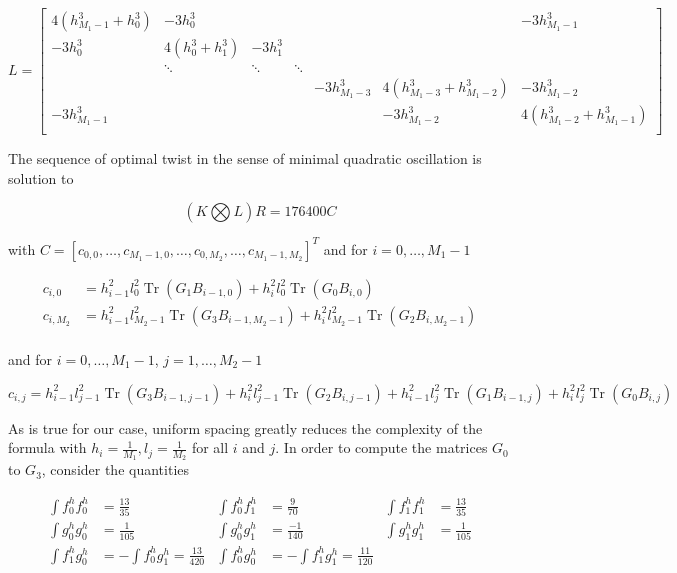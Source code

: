 \documentclass[a4paper, 11pt]{article}
\DeclareMathOperator*{\Tr}{Tr}
\begin{document}
\begin{equation}
  \label{eq:L}
  L = \begin{bmatrix}
    4(h_{M_1-1}^3 + h_0^3) & -3 h_0^3 & & & & & -3h_{M_1-1}^3 \\
    -3h_0^3 & 4(h_0^3 + h_1^3) & -3h_1^3 & & & & \\
    & \ddots & \ddots & \ddots & & & \\
    & & & & -3h_{M_1-3}^3 & 4 (h_{M_1-3}^3 + h_{M_1-2}^3) & -3 h_{M_1-2}^3 \\
    -3h_{M_1-1}^3 & & & & & -3h_{M_1-2}^3 & 4 (h_{M_1-2}^3 + h_{M_1-1}^3) \\
  \end{bmatrix}
\end{equation}

The sequence of optimal twist in the sense of minimal quadratic oscillation is solution to 

\begin{equation}
  (K \bigotimes L) R = 176400 C
\end{equation}

with $C = {[c_{0, 0}, \ldots, c_{M_1-1, 0}, \ldots, c_{0, M_2}, \ldots ,c_{M_1-1, M_2}]}^T$ and for $i=0, \ldots, M_1-1$

\begin{align*}
  c_{i,0} &= h_{i-1}^2 l_0^2 \Tr \left(G_1 B_{i-1, 0}\right) + h_{i}^2 l_0^2 \Tr \left(G_0 B_{i, 0}\right) \\
  c_{i,M_2} &= h_{i-1}^2 l_{M_2-1}^2 \Tr \left(G_3 B_{i-1, M_2-1}\right) + h_{i}^2 l_{M_2-1}^2 \Tr \left(G_2 B_{i, 
  M_2-1}\right) \\
\end{align*}

and for $i=0, \ldots, M_1-1$, $j=1, \ldots, M_2-1$

\begin{equation*}
  c_{i,j} = h_{i-1}^2 l_{j-1}^2 \Tr \left(G_3 B_{i-1, j-1}\right) + h_{i}^2 l_{j-1}^2 \Tr \left(G_2 B_{i, j-1}\right) + 
  h_{i-1}^2 l_{j}^2 \Tr \left(G_1 B_{i-1, j}\right) + h_{i}^2 l_{j}^2 \Tr \left(G_0 B_{i, j}\right)
\end{equation*}


As is true for our case, uniform spacing greatly reduces the complexity of the formula with $h_i = \frac{1}{M_1}, l_j = 
\frac{1}{M_2}$ for all $i$ and $j$. In order to compute the matrices $G_0$ to $G_3$, consider the quantities

\begin{align*}
  \int f_0^h f_0^h &= \frac{13}{35} & \int f_0^h f_1^h &= \frac{9}{70} & \int f_1^h f_1^h &= \frac{13}{35} \\
  \int g_0^h g_0^h &= \frac{1}{105} & \int g_0^h g_1^h &= \frac{-1}{140} & \int g_1^h g_1^h &= \frac{1}{105} \\
  \int f_1^h g_0^h &= - \int f_0^h g_1^h = \frac{13}{420} & \int f_0^h g_0^h &= - \int f_1^h g_1^h = \frac{11}{120}
\end{align*}
\end{document}
